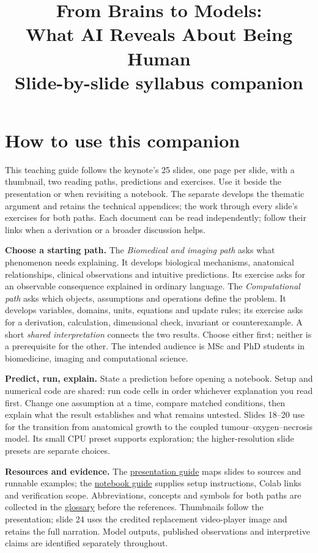 \documentclass[11pt,a4paper]{article}
\title{\textbf{From Brains to Models:\\What AI Reveals About Being Human}\\[5mm]\large Slide-by-slide syllabus companion}
\author{\courseauthor}
\date{\coursedate}
\begin{document}
\maketitle
\section*{How to use this companion}
This teaching guide follows the keynote's 25 slides, one page per slide, with a thumbnail, two reading paths, predictions and exercises. Use it beside the presentation or when revisiting a notebook. The separate  develops the thematic argument and retains the technical appendices; the  work through every slide's exercises for both paths. Each document can be read independently; follow their links when a derivation or a broader discussion helps.

\textbf{Choose a starting path.} The \emph{Biomedical and imaging path} asks what phenomenon needs explaining. It develops biological mechanisms, anatomical relationships, clinical observations and intuitive predictions. Its exercise asks for an observable consequence explained in ordinary language. The \emph{Computational path} asks which objects, assumptions and operations define the problem. It develops variables, domains, units, equations and update rules; its exercise asks for a derivation, calculation, dimensional check, invariant or counterexample. A short \emph{shared interpretation} connects the two results. Choose either first; neither is a prerequisite for the other. The intended audience is MSc and PhD students in biomedicine, imaging and computational science.

\textbf{Predict, run, explain.} State a prediction before opening a notebook. Setup and numerical code are shared: run code cells in order whichever explanation you read first. Change one assumption at a time, compare matched conditions, then explain what the result establishes and what remains untested. Slides 18--20 use  for the transition from anatomical growth to the coupled tumour--oxygen--necrosis model. Its small CPU preset supports exploration; the higher-resolution slide presets are separate choices.

\textbf{Resources and evidence.} The \href{https://github.com/arvidl/brains-to-models/blob/main/talk/resources.md}{presentation guide} maps slides to sources and runnable examples; the \href{https://github.com/arvidl/brains-to-models/blob/main/code/notebooks/README.md}{notebook guide} supplies setup instructions, Colab links and verification scope. Abbreviations, concepts and symbols for both paths are collected in the \hyperref[sec:syllabus-glossary]{glossary} before the references. Thumbnails follow the presentation; slide 24 uses the credited replacement video-player image and retains the full narration. Model outputs, published observations and interpretive claims are identified separately throughout.

\clearpage
\begingroup
\small
\tableofcontents
\endgroup


\clearpage
{}
{}

\end{document}
